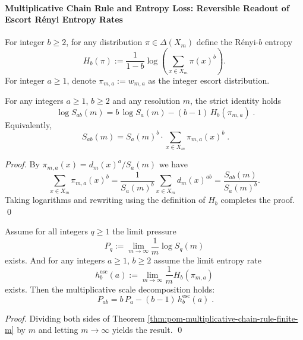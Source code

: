\paragraph{Multiplicative Chain Rule and Entropy Loss: Reversible Readout of Escort R\'enyi Entropy Rates}
For integer \(b\ge 2\), for any distribution \(\pi\in\Delta(X_m)\) define the R\'enyi-\(b\) entropy
\[
H_b(\pi):=\frac{1}{1-b}\log\!\left(\sum_{x\in X_m}\pi(x)^b\right).
\]
For integer \(a\ge 1\), denote \(\pi_{m,a}:=w_{m,a}\) as the integer escort distribution.

\begin{theorem}\label{thm:pom-multiplicative-chain-rule-finite-m}
For any integers \(a\ge 1\), \(b\ge 2\) and any resolution \(m\), the strict identity holds
\[
\boxed{\;
\log S_{ab}(m)
=
b\,\log S_a(m)-(b-1)\,H_b(\pi_{m,a})\; }.
\]
Equivalently,
\[
\boxed{\;
S_{ab}(m)=S_a(m)^b\cdot \sum_{x\in X_m}\pi_{m,a}(x)^b\; }.
\]
\end{theorem}
\begin{proof}
By \(\pi_{m,a}(x)=d_m(x)^a/S_a(m)\) we have
\[
\sum_{x\in X_m}\pi_{m,a}(x)^b
=\frac{1}{S_a(m)^b}\sum_{x\in X_m} d_m(x)^{ab}
=\frac{S_{ab}(m)}{S_a(m)^b}.
\]
Taking logarithms and rewriting using the definition of \(H_b\) completes the proof. \qed
\end{proof}

\begin{theorem}\label{thm:pom-pressure-entropy-factorization-multiplicative}
Assume for all integers \(q\ge 1\) the limit pressure
\[
P_q:=\lim_{m\to\infty}\frac{1}{m}\log S_q(m)
\]
exists.
And for any integers \(a\ge 1\), \(b\ge 2\) assume the limit entropy rate
\[
h^{\mathrm{esc}}_b(a):=\lim_{m\to\infty}\frac{1}{m}H_b(\pi_{m,a})
\]
exists.
Then the multiplicative scale decomposition holds:
\[
\boxed{\;
P_{ab}=b\,P_a-(b-1)\,h^{\mathrm{esc}}_b(a)\; }.
\]
\end{theorem}
\begin{proof}
Dividing both sides of Theorem \ref{thm:pom-multiplicative-chain-rule-finite-m} by \(m\) and letting \(m\to\infty\) yields the result. \qed
\end{proof}

